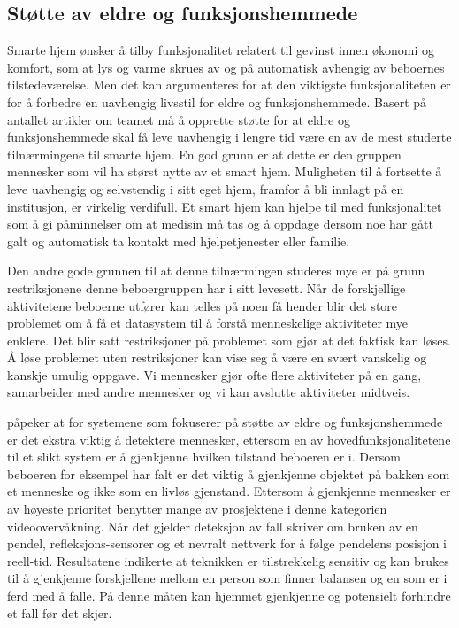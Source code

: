 \subsection*{Støtte av eldre og funksjonshemmede}
Smarte hjem ønsker å tilby funksjonalitet relatert til gevinst innen økonomi og komfort, som at lys og varme skrues av og på automatisk avhengig av beboernes tilstedeværelse. Men det kan argumenteres for at den viktigste funksjonaliteten er for å forbedre en uavhengig livsstil for eldre og funksjonshemmede. Basert på antallet artikler om teamet må å opprette støtte for at eldre og funksjonshemmede skal få leve uavhengig i lengre tid være en av de mest studerte tilnærmingene til smarte hjem. En god grunn er at dette er den gruppen mennesker som vil ha størst nytte av et smart hjem. Muligheten til å fortsette å leve uavhengig og selvstendig i sitt eget hjem, framfor å bli innlagt på en institusjon, er virkelig verdifull. Et smart hjem kan hjelpe til med funksjonalitet som å gi påminnelser om at medisin må tas og å oppdage dersom noe har gått galt og automatisk ta kontakt med hjelpetjenester eller familie.

Den andre gode grunnen til at denne tilnærmingen studeres mye er på grunn restriksjonene denne beboergruppen har i sitt levesett. Når de forskjellige aktivitetene beboerne utfører kan telles på noen få hender blir det store problemet om å få et datasystem til å forstå menneskelige aktiviteter mye enklere. Det blir satt restriksjoner på problemet som gjør at det faktisk kan løses. Å løse problemet uten restriksjoner kan vise seg å være en svært vanskelig og kanskje umulig oppgave. Vi mennesker gjør ofte flere aktiviteter på en gang, samarbeider med andre mennesker og vi kan avslutte aktiviteter midtveis.


\citet{desilva12} påpeker at for systemene som fokuserer på støtte av eldre og funksjonshemmede er det ekstra viktig å detektere mennesker, ettersom en av hovedfunksjonalitetene til et slikt system er å gjenkjenne hvilken tilstand beboeren er i. Dersom beboeren for eksempel har falt er det viktig å gjenkjenne objektet på bakken som et menneske og ikke som en livløs gjenstand. Ettersom å gjenkjenne mennesker er av høyeste prioritet benytter mange av prosjektene i denne kategorien videoovervåkning. Når det gjelder deteksjon av fall skriver \citet{elliot09} om bruken av en pendel, refleksjons-sensorer og et nevralt nettverk for å følge pendelens posisjon i reell-tid. Resultatene indikerte at teknikken er tilstrekkelig sensitiv og kan brukes til å gjenkjenne forskjellene mellom en person som finner balansen og en som er i ferd med å falle. På denne måten kan hjemmet gjenkjenne og potensielt forhindre et fall før det skjer.

